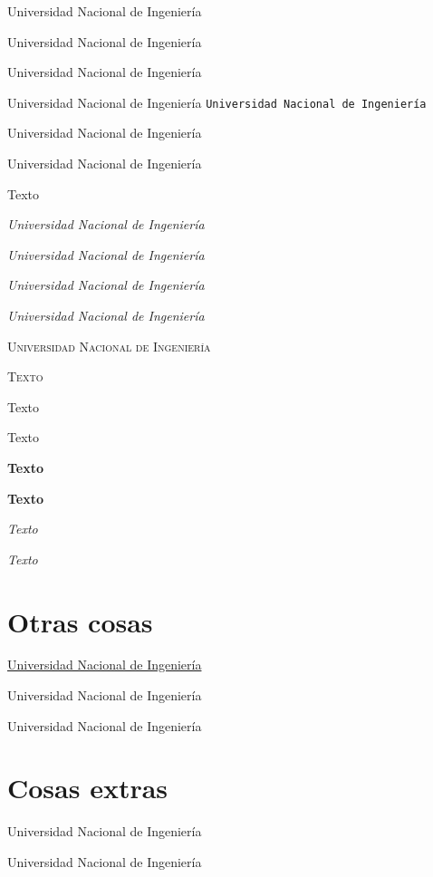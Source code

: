 \documentclass{article}
\begin{document}
\textrm{Universidad Nacional de Ingeniería} %

{\rmfamily Universidad Nacional de Ingeniería} %

\textsf{Universidad Nacional de Ingeniería}

{\sffamily Universidad Nacional de Ingeniería}
\texttt{Universidad Nacional de Ingeniería}

{\ttfamily Universidad Nacional de Ingeniería} %

\textup{Universidad Nacional de Ingeniería}

{\upshape Texto}

\textit{Universidad Nacional de Ingeniería}

{\itshape Universidad Nacional de Ingeniería}

\textsl{Universidad Nacional de Ingeniería}	%

{\slshape Universidad Nacional de Ingeniería}

\textsc{Universidad Nacional de Ingeniería} %

\tableofcontents

{\scshape Texto}

\textmd{Texto}

{\mdseries Texto}

\textbf{Texto}

{\bfseries Texto}

\emph{Texto}

{\em Texto}

\section{Otras cosas}

\underline{Universidad Nacional de Ingeniería}

{\Huge Universidad Nacional de Ingeniería}

{\LARGE Universidad Nacional de Ingeniería}

\section{Cosas extras}

{\large Universidad Nacional de Ingeniería}

{\tiny Universidad Nacional de Ingeniería}
\end{document}
